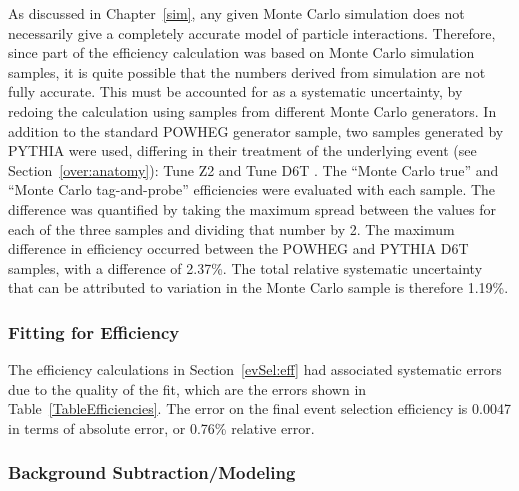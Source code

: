 As discussed in Chapter~\ref{sim}, 
any given Monte Carlo simulation 
does not necessarily give a completely accurate 
model of particle interactions.  %
Therefore, since part of the efficiency calculation 
was based on Monte Carlo simulation samples, 
it is quite possible that the numbers 
derived from simulation are not fully 
accurate.  
This must be accounted for as a systematic 
uncertainty, %
by redoing the calculation using samples 
from different Monte Carlo generators.  
In addition to the standard POWHEG generator 
sample, 
two samples generated by PYTHIA were used, 
differing in their treatment of the underlying event
(see Section~\ref{over:anatomy}): 
Tune Z2 \cite{TuneZ2} 
and Tune D6T \cite{TuneD6T}.  
The ``Monte Carlo true'' and ``Monte Carlo tag-and-probe'' 
efficiencies were evaluated with each sample.  
The difference was quantified by taking the 
maximum spread between the values for each of the 
three samples 
and dividing that number by 2.  
The maximum difference in efficiency occurred 
between the POWHEG and PYTHIA D6T samples, 
with a difference of 2.37\%.  
The total relative systematic uncertainty that can be 
attributed to variation in the Monte Carlo 
sample is therefore 1.19\%.  



\subsubsection{Fitting for Efficiency}
\label{anMeth:SystsOtherFitEff}


The efficiency calculations in Section~\ref{evSel:eff} 
had associated systematic errors due to the 
quality 
of the fit, 
which are the errors shown in Table~\ref{TableEfficiencies}.  
The error on the final event selection 
efficiency is 0.0047 in terms of absolute error, 
or 0.76\% relative error.  


\subsubsection{Background Subtraction/Modeling}
\label{anMeth:SystsOtherBGSub}

